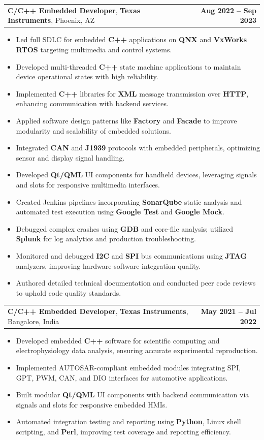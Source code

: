 \documentclass[letterpaper,11pt]{article}
\makeatletter
\newcommand{\resumeItem}[1]{
  \item\footnotesize{
    {#1 \vspace{-2pt}}
  }
}
\newcommand{\resumeSubheading}[4]{
  \vspace{-2pt}\item
    \begin{tabular*}{1.0\textwidth}[t]{l@{\extracolsep{\fill}}r}
      \textbf{\fontsize{10pt}{14pt}\selectfont #3}, \textbf{\fontsize{10pt}{14pt}\selectfont #1}, \fontsize{10pt}{14pt}\selectfont #4 & \textbf{\fontsize{10pt}{14pt}\selectfont #2} \\
    \end{tabular*}\vspace{-7pt}
}
\newcommand{\resumeItemListStart}{\begin{itemize}[leftmargin=*]}
\newcommand{\resumeItemListEnd}{\end{itemize}\vspace{-5pt}}
\makeatother
\begin{document}
    \resumeSubheading
        {Texas Instruments}{Aug 2022 -- Sep 2023}
        {C/C++ Embedded Developer}{Phoenix, AZ}
      \resumeItemListStart
        \resumeItem{Led full SDLC for embedded \textbf{C++} applications on \textbf{QNX} and \textbf{VxWorks RTOS} targeting multimedia and control systems.}
        \resumeItem{Developed multi-threaded \textbf{C++} state machine applications to maintain device operational states with high reliability.}
        \resumeItem{Implemented \textbf{C++} libraries for \textbf{XML} message transmission over \textbf{HTTP}, enhancing communication with backend services.}
        \resumeItem{Applied software design patterns like \textbf{Factory} and \textbf{Facade} to improve modularity and scalability of embedded solutions.}
        \resumeItem{Integrated \textbf{CAN} and \textbf{J1939} protocols with embedded peripherals, optimizing sensor and display signal handling.}
        \resumeItem{Developed \textbf{Qt/QML} UI components for handheld devices, leveraging signals and slots for responsive multimedia interfaces.}
        \resumeItem{Created Jenkins pipelines incorporating \textbf{SonarQube} static analysis and automated test execution using \textbf{Google Test} and \textbf{Google Mock}.}
        \resumeItem{Debugged complex crashes using \textbf{GDB} and core-file analysis; utilized \textbf{Splunk} for log analytics and production troubleshooting.}
        \resumeItem{Monitored and debugged \textbf{I2C} and \textbf{SPI} bus communications using \textbf{JTAG} analyzers, improving hardware-software integration quality.}
        \resumeItem{Authored detailed technical documentation and conducted peer code reviews to uphold code quality standards.}
      \resumeItemListEnd

    \resumeSubheading
        {Texas Instruments}{May 2021 -- Jul 2022}
        {C/C++ Embedded Developer}{Bangalore, India}
      \resumeItemListStart
        \resumeItem{Developed embedded \textbf{C++} software for scientific computing and electrophysiology data analysis, ensuring accurate experimental reproduction.}
        \resumeItem{Implemented AUTOSAR-compliant embedded modules integrating SPI, GPT, PWM, CAN, and DIO interfaces for automotive applications.}
        \resumeItem{Built modular \textbf{Qt/QML} UI components with backend communication via signals and slots for responsive embedded HMIs.}
        \resumeItem{Automated integration testing and reporting using \textbf{Python}, Linux shell scripting, and \textbf{Perl}, improving test coverage and reporting efficiency.}
      \resumeItemListEnd
\end{document}
